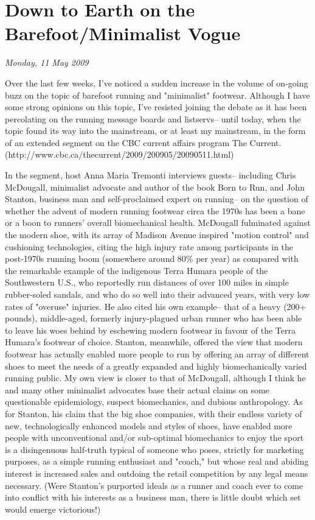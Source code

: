 \chapter{Down to Earth on the Barefoot/Minimalist Vogue}
\textit{Monday, 11 May 2009}
\bigskip

Over the last few weeks, I've noticed a sudden increase in the volume of on-going buzz on the topic of barefoot running and "minimalist" footwear. Although I have some strong opinions on this topic, I've resisted joining the debate as it has been percolating on the running message boards and listservs-- until today, when the topic found its way into the mainstream, or at least my mainstream, in the form of an extended segment on the CBC current affairs program The Current. (http://www.cbc.ca/thecurrent/2009/200905/20090511.html)

In the segment, host Anna Maria Tremonti interviews guests-- including Chris McDougall, minimalist advocate and author of the book Born to Run, and John Stanton, business man and self-proclaimed expert on running-- on the question of whether the advent of modern running footwear circa the 1970s has been a bane or a boon to runners' overall biomechanical health. McDougall fulminated against the modern shoe, with its array of Madison Avenue inspired "motion control" and cushioning technologies, citing the high injury rate among participants in the post-1970s running boom (somewhere around 80\% per year) as compared with the remarkable example of the indigenous Terra Humara people of the Southwestern U.S., who reportedly run distances of over 100 miles in simple rubber-soled sandals, and who do so well into their advanced years, with very low rates of "overuse" injuries. He also cited his own example-- that of a heavy (200+ pounds), middle-aged, formerly injury-plagued urban runner who has been able to leave his woes behind by eschewing modern footwear in favour of the Terra Humara's footwear of choice. Stanton, meanwhile, offered the view that modern footwear has actually enabled more people to run by offering an array of different shoes to meet the needs of a greatly expanded and highly biomechanically varied running public. My own view is closer to that of McDougall, although I think he and many other minimalist advocates base their actual claims on some questionable epidemiology, suspect biomechanics, and dubious anthropology. As for Stanton, his claim that the big shoe companies, with their endless variety of new, technologically enhanced models and styles of shoes, have enabled more people with unconventional and/or sub-optimal biomechanics to enjoy the sport is a disingenuous half-truth typical of someone who poses, strictly for marketing purposes, as a simple running enthusiast and "coach," but whose real and abiding interest is increased sales and outdoing the retail competition by any legal means necessary. (Were Stanton's purported ideals as a runner and coach ever to come into conflict with his interests as a business man, there is little doubt which set would emerge victorious!)

